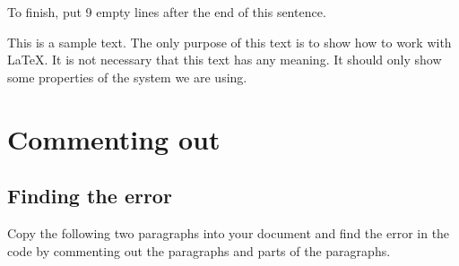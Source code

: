 \documentclass[10pt, paper=a4, abstracton]{scrartcl}
\begin{document}
  To finish, put 9 empty lines after the end of this sentence.
  
  
  
  
  
  
  
  
  This is a sample text. The only purpose of this text is to show how to work with \LaTeX . It is not necessary that this text has any meaning. It should only show some properties of the system we are using.


\section{Commenting out}


\subsection{Finding the error}

Copy the following two paragraphs into your document and find the error in the code by commenting out the paragraphs and parts of the paragraphs.
\end{document}
